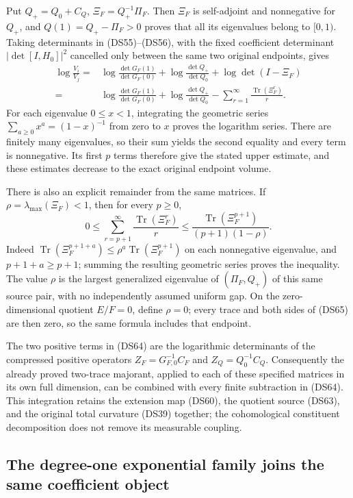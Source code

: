 \documentclass{article}
\begin{document}
Put $Q_+=Q_0+C_Q$, $\Xi_F=Q_+^{-1}\Pi_F$.  Then $\Xi_F$ is
self-adjoint and nonnegative for $Q_+$, and
$Q(1)=Q_+-\Pi_F>0$ proves that all its eigenvalues belong to
$[0,1)$.  Taking determinants in (DS55)--(DS56), with the fixed
coefficient determinant $|\det[I,H_0]|^2$ cancelled only between
the same two original endpoints, gives
\[
\begin{split}
 \log\frac{V_i}{V_j}
 ={}&\log\frac{\det G_F(1)}{\det G_F(0)}
   +\log\frac{\det Q_+}{\det Q_0}
   +\log\det(I-\Xi_F)\\
 ={}&\log\frac{\det G_F(1)}{\det G_F(0)}
   +\log\frac{\det Q_+}{\det Q_0}
   -\sum_{r=1}^\infty\frac{\operatorname{Tr}(\Xi_F^r)}r.
\end{split}\tag{DS64}
\]
For each eigenvalue $0\leq x<1$, integrating the geometric series
$\sum_{a\geq0}x^a=(1-x)^{-1}$ from zero to $x$ proves the
logarithm series.  There are finitely many eigenvalues, so their
sum yields the second equality and every term is nonnegative.
Its first $p$ terms therefore give the stated upper estimate, and
these estimates decrease to the exact original endpoint volume.

There is also an explicit remainder from the same matrices.  If
$\rho=\lambda_{\max}(\Xi_F)<1$, then for every $p\geq0$,
\[
 0\leq
 \sum_{r=p+1}^\infty\frac{\operatorname{Tr}(\Xi_F^r)}r
 \leq\frac{\operatorname{Tr}(\Xi_F^{p+1})}{(p+1)(1-\rho)}.
 \tag{DS65}
\]
Indeed $\operatorname{Tr}(\Xi_F^{p+1+a})
\leq\rho^a\operatorname{Tr}(\Xi_F^{p+1})$ on each nonnegative
eigenvalue, and $p+1+a\geq p+1$; summing the resulting geometric
series proves the inequality.  The value $\rho$ is the largest
generalized eigenvalue of $(\Pi_F,Q_+)$ of this same source pair,
with no independently assumed uniform gap.  On the zero-dimensional
quotient $E/F=0$, define $\rho=0$; every trace and both sides of
(DS65) are then zero, so the same formula includes that endpoint.

The two positive terms in (DS64) are the logarithmic determinants
of the compressed positive operators
$Z_F=G_{F,0}^{-1}C_F$ and $Z_Q=Q_0^{-1}C_Q$.
Consequently the already proved two-trace majorant, applied to
each of these specified matrices in its own full dimension, can
be combined with every finite subtraction in (DS64).  This
integration retains the extension map (DS60), the quotient source
(DS63), and the original total curvature (DS39) together; the
cohomological constituent decomposition does not remove its
measurable coupling.

\subsection{The degree-one exponential family joins the same coefficient object}
\end{document}
